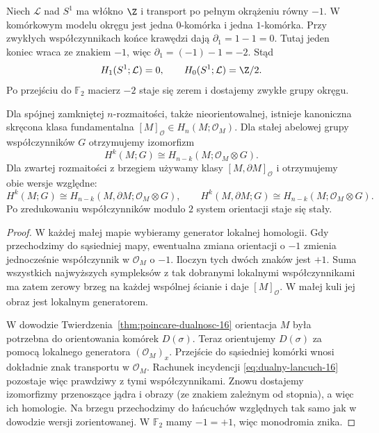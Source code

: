 \begin{przyklad}
Niech $\mathcal L$ nad $S^1$
ma włókno $\Z$ i transport
po pełnym okrążeniu
równy $-1$. W komórkowym
modelu okręgu jest
jedna $0$-komórka
i jedna $1$-komórka.
Przy zwykłych
współczynnikach końce
krawędzi dają
$\partial_1=1-1=0$.
Tutaj jeden koniec
wraca ze znakiem
$-1$, więc
$\partial_1=(-1)-1=-2$.
Stąd
\[
 H_1(S^1;\mathcal L)=0,\qquad
 H_0(S^1;\mathcal L)=\Z/2.
\]
Po przejściu do
$\mathbb F_2$ macierz
$-2$ staje się zerem
i dostajemy zwykłe
grupy okręgu.
\end{przyklad}

\begin{twierdzenie}
\label{thm:pd-skrecenie-16}
Dla spójnej zamkniętej
$n$-rozmaitości, także
nieorientowalnej, istnieje
kanoniczna skręcona klasa
fundamentalna
$[M]_{\mathcal O}\in
H_n(M;\mathcal O_M)$.
Dla stałej abelowej grupy
współczynników $G$
otrzymujemy izomorfizm
\[
 H^k(M;G)\cong
 H_{n-k}(M;\mathcal O_M\otimes G).
\]
Dla zwartej rozmaitości z brzegiem używamy
klasy $[M,\partial M]_{\mathcal O}$ i otrzymujemy
obie wersje względne:
\[
 H^k(M;G)\cong H_{n-k}(M,\partial M;\mathcal O_M\otimes G),
 \qquad
 H^k(M,\partial M;G)\cong H_{n-k}(M;\mathcal O_M\otimes G).
\]
Po zredukowaniu
współczynników modulo $2$
system orientacji staje
się stały.
\end{twierdzenie}
\begin{proof}
W każdej małej mapie
wybieramy generator
lokalnej homologii.
Gdy przechodzimy
do sąsiedniej mapy,
ewentualna zmiana
orientacji o $-1$
zmienia jednocześnie
współczynnik w
$\mathcal O_M$ o $-1$.
Iloczyn tych dwóch
znaków jest $+1$.
Suma wszystkich
najwyższych sympleksów
z tak dobranymi
lokalnymi współczynnikami
ma zatem zerowy brzeg
na każdej wspólnej
ścianie i daje
$[M]_{\mathcal O}$.
W małej kuli jej obraz
jest lokalnym generatorem.

W dowodzie
Twierdzenia~\ref{thm:poincare-dualnosc-16}
orientacja $M$ była
potrzebna do orientowania
komórek $D(\sigma)$.
Teraz orientujemy
$D(\sigma)$ za pomocą
lokalnego generatora
$(\mathcal O_M)_x$.
Przejście do sąsiedniej
komórki wnosi dokładnie
znak transportu
w $\mathcal O_M$.
Rachunek incydencji
\eqref{eq:dualny-lancuch-16}
pozostaje więc prawdziwy
z tymi współczynnikami.
Znowu dostajemy
izomorfizmy przenoszące jądra i obrazy
(ze znakiem zależnym od stopnia), a więc ich homologie.
Na brzegu przechodzimy
do łańcuchów względnych
tak samo jak w dowodzie
wersji zorientowanej.
W $\mathbb F_2$
mamy $-1=+1$,
więc monodromia znika.
\end{proof}

